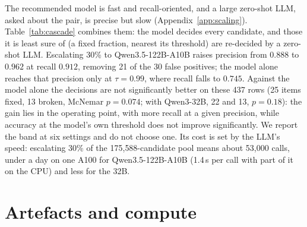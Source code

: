 \documentclass[11pt]{article}
\begin{document}
The recommended model is fast and recall-oriented, and a large zero-shot LLM, asked about the pair,
is precise but slow (Appendix~\ref{app:scaling}). Table~\ref{tab:cascade} combines them: the model
decides every candidate, and those it is least sure of (a fixed fraction, nearest its threshold) are
re-decided by a zero-shot LLM\@. Escalating 30\% to Qwen3.5-122B-A10B raises precision from $0.888$ to
$0.962$ at recall $0.912$, removing 21 of the 30 false positives; the model alone reaches that
precision only at $\tau = 0.99$, where recall falls to $0.745$. Against the model alone the
decisions are not significantly better on these 437 rows (25 items fixed, 13 broken,
McNemar $p = 0.074$; with Qwen3-32B, 22 and 13, $p = 0.18$): the gain lies in the operating point, with more recall at a given precision, while accuracy at the model's own threshold does not improve significantly. We report the band at six settings and do not choose one. Its cost is set by the
LLM's speed: escalating 30\% of the 175{,}588-candidate pool means about 53{,}000 calls, under
a day on one A100 for Qwen3.5-122B-A10B (1.4\,s per call with part of it on the CPU) and less for the 32B.

\section{Artefacts and compute}
\label{app:artifacts}
\end{document}
